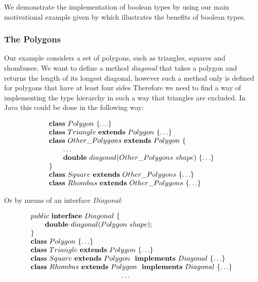 \documentclass{l4proj}
\begin{document}
We demonstrate the implementation of boolean types by using our main motivational example given by \citet{Dardha2013} which illustrates the benefits of boolean types.

\subsubsection{The Polygons}

Our example considers a set of polygons, such as triangles, squares and rhombuses.
We want to define a method \emph{diagonal} that takes a polygon and returns the length of its longest diagonal, however such a method only is defined for polygons that have at least four sides
Therefore we need to find a way of implementing the type hierarchy in such a way that triangles are excluded.
In Java this could be done in the following way:

\begin{equation}
    \begin{array}{l}
        \synclass Polygon \ \{ \ldots\}
        \\
        \syndecl{Triangle}{Polygon} {\ldots}
        \\
        \syndecl{Other\_Polygons}{Polygon} {
            \\
            \qquad \ldots
            \\
            \qquad \textbf{double}\ diagonal(Other\_Polygons \ shape)\ \{\ldots \}
            \\
        }
        \\
        \syndecl{Square}{Other\_Polygons}{\ldots}
        \\
        \syndecl{Rhombus}{Other\_Polygons} {\ldots}
    \end{array}
\end{equation}

Or by means of an interface \emph{Diagonal}:

\begin{equation}
    \label{eq:interface}
    \begin{array}{l}
        public \ \syninterface Diagonal\ \{
        \\
        \qquad \textbf{double}\ diagonal(Polygon \ shape);
        \\
        \}
        \\
        \synclass Polygon \ \{\ldots\}
        \\
        \syndecl{Triangle}{Polygon} {\ldots}
        \\
        \synidecl{Square}{Polygon} \synimpl Diagonal \ \{\ldots\}
        \\
        \synidecl{Rhombus}{Polygon} \synimpl Diagonal \ \{\ldots\}
        \\
        \hspace{4.5cm} \ldots
    \end{array}
\end{equation}
\end{document}

